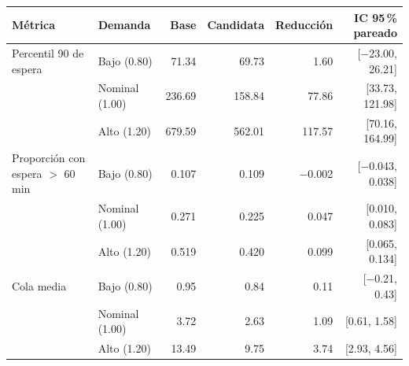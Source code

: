 \begin{tabular}{llrrrr}
\toprule
Métrica & Demanda & Base & Candidata & Reducción & IC 95\,\% pareado \\
\midrule
Percentil 90 de espera & Bajo (0.80) & 71.34 & 69.73 & 1.60 & [$-$23.00, 26.21] \\
 & Nominal (1.00) & 236.69 & 158.84 & 77.86 & [33.73, 121.98] \\
 & Alto (1.20) & 679.59 & 562.01 & 117.57 & [70.16, 164.99] \\
\midrule
Proporción con espera $>$ 60 min & Bajo (0.80) & 0.107 & 0.109 & $-$0.002 & [$-$0.043, 0.038] \\
 & Nominal (1.00) & 0.271 & 0.225 & 0.047 & [0.010, 0.083] \\
 & Alto (1.20) & 0.519 & 0.420 & 0.099 & [0.065, 0.134] \\
\midrule
Cola media & Bajo (0.80) & 0.95 & 0.84 & 0.11 & [$-$0.21, 0.43] \\
 & Nominal (1.00) & 3.72 & 2.63 & 1.09 & [0.61, 1.58] \\
 & Alto (1.20) & 13.49 & 9.75 & 3.74 & [2.93, 4.56] \\
\bottomrule
\end{tabular}
